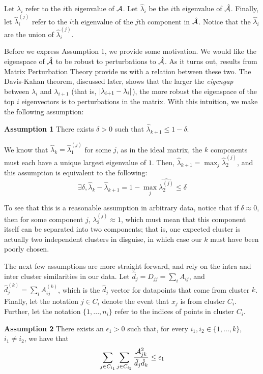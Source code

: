 Let $\lambda_i$ refer to the $i$th eigenvalue of $\mathcal{A}$. Let $\hat{\lambda}_i$
be the $i$th eigenvalue of $\hat{\mathcal{A}}$. Finally, let $\hat{\lambda}^{(j)}_i$
refer to the $i$th eigenvalue of the $j$th component in $\hat{\mathcal{A}}$. Notice that
the $\hat{\lambda}_i$ are the union of $\hat{\lambda}^{(j)}_i$.

Before we express Assumption 1, we provide some motivation. We would like
the eigenspace of $\hat{\mathcal{A}}$ to be robust to perturbations to $\hat{\mathcal{A}}$. As
it turns out, results from Matrix Perturbation Theory provide us with a relation
between these two. The Davis-Kahan theorem, discussed later, shows that the
larger the \textit{eigengap} between $\lambda_i$ and $\lambda_{i+1}$ (that is,
$\lvert\lambda_{i+1} - \lambda_i\rvert$), the more robust the eigenspace of the top
$i$ eigenvectors is to perturbations in the matrix. With this intuition, we
make the following assumption:

\textbf{Assumption 1} There exists $\delta > 0$ such that
$\hat{\lambda}_{k+1} \leq 1 - \delta$.

We know that $\hat{\lambda}_k = \hat{\lambda}^{(j)}_1$ for some $j$, as in the
ideal matrix, the $k$ components must each have a unique largest eigenvalue of
$1$. Then, $\hat{\lambda}_{k+1} = \max_j \hat{\lambda}^{(j)}_2$, and this
assumption is equivalent to the following:
\[ \exists \delta, \hat{\lambda}_k - \hat{\lambda}_{k+1} = 1 - \max_j \hat{\lambda^{(j)}_2} \leq \delta \]

To see that this is a reasonable assumption in arbitrary data, notice that if
$\delta \approx 0$, then for some component $j$, $\lambda^{(j)}_2 \approx 1$,
which must mean that this component itself can be separated into two components;
that is, one expected cluster is actually two independent clusters in disguise,
in which case our $k$ must have been poorly chosen.

The next few assumptions are more straight forward, and rely on the intra and
inter cluster similarities in our data. Let $\hat{d}_{j} = D_{jj} = \sum_i A_{ij}$,
and $\hat{d}_{j}^{(k)} = \sum_i A_{ij}^{(k)}$, which is the $\hat{d}_j$ vector
for datapoints that come from cluster $k$. Finally, let the notation $j \in
C_i$ denote the event that $x_j$ is from cluster $C_i$. Further, let the
notation $\{1,...,n_i\}$ refer to the indices of points in cluster $C_i$.

\textbf{Assumption 2}
    There exists an $\epsilon_1 > 0$ such that, for every
    $i_1, i_2 \in \{1,...,k\}$, $i_1 \neq i_2$, we have that
    \[ \sum_{j \in C_{i_1}} \sum_{j \in C_{i_2}} \frac{\mathcal{A}_{jk}^2}{\hat{d}_j \hat{d}_k} \leq \epsilon_1 \]

